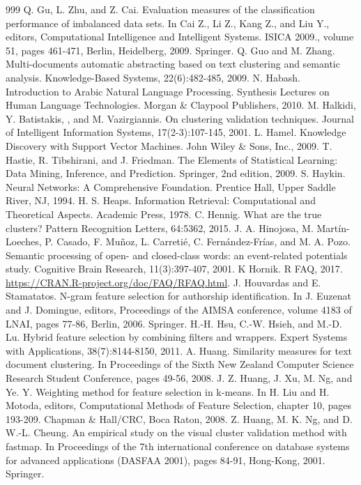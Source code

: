 \documentclass[11pt,openany,executivepaper]{book}
\begin{document}
\begin{thebibliography}{999}
 Q. Gu, L. Zhu, and Z. Cai. Evaluation measures of the classification performance of imbalanced data sets. In Cai Z., Li Z., Kang Z., and Liu Y., editors, Computational Intelligence and Intelligent Systems. ISICA 2009., volume 51, pages 461-471, Berlin, Heidelberg, 2009. Springer.
 Q. Guo and M. Zhang. Multi-documents automatic abstracting based on text clustering and semantic analysis. Knowledge-Based Systems, 22(6):482-485, 2009.
 N. Habash. Introduction to Arabic Natural Language Processing. Synthesis Lectures on Human Language Technologies. Morgan \& Claypool Publishers, 2010.
 M. Halkidi, Y. Batistakis, , and M. Vazirgiannis. On clustering validation techniques. Journal of Intelligent Information Systems, 17(2-3):107-145, 2001.
 L. Hamel. Knowledge Discovery with Support Vector Machines. John Wiley \& Sons, Inc., 2009.
 T. Hastie, R. Tibshirani, and J. Friedman. The Elements of Statistical Learning: Data Mining, Inference, and Prediction. Springer, 2nd edition, 2009.
 S. Haykin. Neural Networks: A Comprehensive Foundation. Prentice Hall, Upper Saddle River, NJ, 1994.
 H. S. Heaps. Information Retrieval: Computational and Theoretical Aspects. Academic Press, 1978.
 C. Hennig. What are the true clusters? Pattern Recognition Letters, 64:5362, 2015.
 J. A. Hinojosa, M. Martín-Loeches, P. Casado, F. Muñoz, L. Carretié, C. Fernández-Frías, and M. A. Pozo. Semantic processing of open- and closed-class words: an event-related potentials study. Cognitive Brain Research, 11(3):397-407, 2001.
 K Hornik. R FAQ, 2017. \url{https://CRAN.R-project.org/doc/FAQ/RFAQ.html}.
 J. Houvardas and E. Stamatatos. N-gram feature selection for authorship identification. In J. Euzenat and J. Domingue, editors, Proceedings of the AIMSA conference, volume 4183 of LNAI, pages 77-86, Berlin, 2006. Springer.
 H.-H. Hsu, C.-W. Hsieh, and M.-D. Lu. Hybrid feature selection by combining filters and wrappers. Expert Systems with Applications, 38(7):8144-8150, 2011.
 A. Huang. Similarity measures for text document clustering. In Proceedings of the Sixth New Zealand Computer Science Research Student Conference, pages 49-56, 2008.
 J. Z. Huang, J. Xu, M. Ng, and Ye. Y. Weighting method for feature selection in k-means. In H. Liu and H. Motoda, editors, Computational Methods of Feature Selection, chapter 10, pages 193-209. Chapman \& Hall/CRC, Boca Raton, 2008.
 Z. Huang, M. K. Ng, and D. W.-L. Cheung. An empirical study on the visual cluster validation method with fastmap. In Proceedings of the 7th international conference on database systems for advanced applications (DASFAA 2001), pages 84-91, Hong-Kong, 2001. Springer.

\end{thebibliography}
\end{document}
